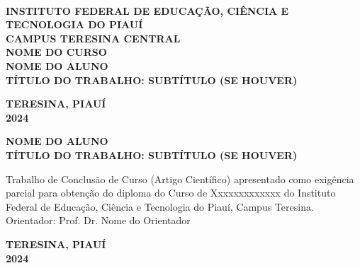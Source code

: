 \documentclass[12pt, a4paper]{article}
\begin{document}
\begin{titlepage}
    \centering
     \\[1cm]
    
    \textbf{\MakeUppercase{Instituto Federal de Educação, Ciência e Tecnologia do Piauí}} \\
    \textbf{\MakeUppercase{Campus Teresina Central}} \\
    \textbf{\MakeUppercase{Nome do Curso}} \\[3.5cm]
    
    \textbf{\MakeUppercase{Nome do Aluno}} \\[4.5cm]
    
    \textbf{\MakeUppercase{Título do Trabalho: Subtítulo (se houver)}}
    
    \vfill
    
    \textbf{\MakeUppercase{Teresina, Piauí}} \\
    \textbf{2024}
\end{titlepage}

\begin{titlepage}
    \centering
    \textbf{\MakeUppercase{Nome do Aluno}} \\[4.5cm]
    
    \textbf{\MakeUppercase{Título do Trabalho: Subtítulo (se houver)}} \\[2.5cm]
    
    \hfill
    \begin{minipage}{0.5\textwidth}
        \raggedright
        Trabalho de Conclusão de Curso (Artigo Científico) apresentado como exigência parcial para obtenção do diploma do Curso de Xxxxxxxxxxxxx do Instituto Federal de Educação, Ciência e Tecnologia do Piauí, Campus Teresina.\\[1.5cm]
        Orientador: Prof. Dr. Nome do Orientador
    \end{minipage}
    
    \vfill
    
    \textbf{\MakeUppercase{Teresina, Piauí}} \\
    \textbf{2024}
\end{titlepage}
\end{document}
